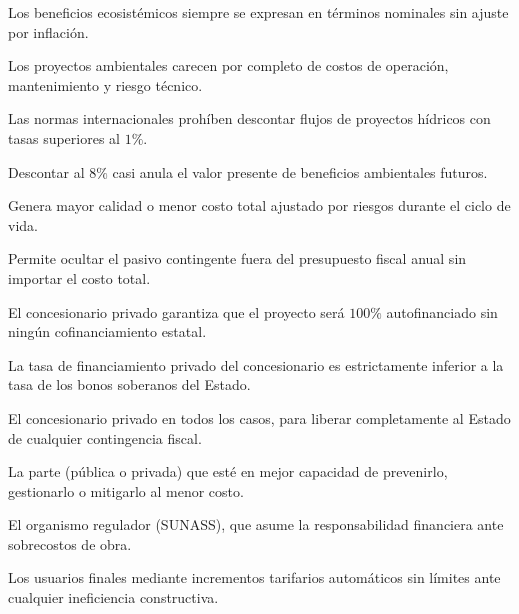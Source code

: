 \begin{opts}
    \item Los beneficios ecosistémicos siempre se expresan en términos nominales sin ajuste por inflación.
    \item Los proyectos ambientales carecen por completo de costos de operación, mantenimiento y riesgo técnico.
    \item Las normas internacionales prohíben descontar flujos de proyectos hídricos con tasas superiores al $1\%$.
    \item Descontar al $8\%$ casi anula el valor presente de beneficios ambientales futuros.
\end{opts}

\begin{opts}
    \item Genera mayor calidad o menor costo total ajustado por riesgos durante el ciclo de vida.
    \item Permite ocultar el pasivo contingente fuera del presupuesto fiscal anual sin importar el costo total.
    \item El concesionario privado garantiza que el proyecto será $100\%$ autofinanciado sin ningún cofinanciamiento estatal.
    \item La tasa de financiamiento privado del concesionario es estrictamente inferior a la tasa de los bonos soberanos del Estado.
\end{opts}

\begin{opts}
    \item El concesionario privado en todos los casos, para liberar completamente al Estado de cualquier contingencia fiscal.
    \item La parte (pública o privada) que esté en mejor capacidad de prevenirlo, gestionarlo o mitigarlo al menor costo.
    \item El organismo regulador (SUNASS), que asume la responsabilidad financiera ante sobrecostos de obra.
    \item Los usuarios finales mediante incrementos tarifarios automáticos sin límites ante cualquier ineficiencia constructiva.
\end{opts}

